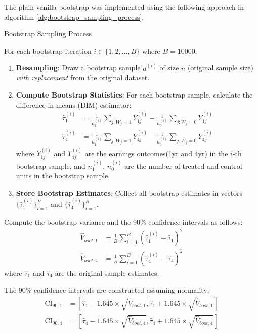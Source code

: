 \documentclass[11pt]{article}
\numberwithin{equation}{section}
\begin{document}
The plain vanilla bootstrap was implemented using the following approach in algorithm \ref{alg:bootstrap_sampling_process}.


\begin{algorithm}
    \caption{Bootstrap Sampling Process}
    \label{alg:bootstrap_sampling_process}
    For each bootstrap iteration $i \in \{1, 2, \ldots, B\}$ where $B = 10000$:
    \begin{enumerate}
    \item \textbf{Resampling}: Draw a bootstrap sample $d^{(i)}$ of size $n$ (original sample size) \textit{with replacement} from the original dataset. 
    
    \item \textbf{Compute Bootstrap Statistics}: For each bootstrap sample, calculate the difference-in-means (DIM) estimator:
    \begin{align}
        \hat{\tau}^{(i)}_1 &= \frac{1}{n^{(i)}_1} \sum_{j: W_j = 1} Y_{1j}^{(i)} - \frac{1}{n^{(i)}_0} \sum_{j: W_j = 0} Y_{1j}^{(i)} \\
        \hat{\tau}^{(i)}_4 &= \frac{1}{n^{(i)}_1} \sum_{j: W_j = 1} Y_{4j}^{(i)} - \frac{1}{n^{(i)}_0} \sum_{j: W_j = 0} Y_{4j}^{(i)}
    \end{align}
    where $Y_{1j}^{(i)}$ and $Y_{4j}^{(i)}$ are the earnings outcomes(1yr and 4yr) in the $i$-th bootstrap sample, and $n^{(i)}_1$, $n^{(i)}_0$ are the number of treated and control units in the bootstrap sample.
    
    \item \textbf{Store Bootstrap Estimates}: Collect all bootstrap estimates in vectors $\{\hat{\tau}^{(i)}_1\}_{i=1}^B$ and $\{\hat{\tau}^{(i)}_4\}_{i=1}^B$.
\end{enumerate}

Compute the bootstrap variance and the 90\% confidence intervals as follows:
\begin{align}
    \hat{V}_{boot,1} &= \frac{1}{B} \sum_{i=1}^B \left(\hat{\tau}^{(i)}_1 - \hat{\tau}_1\right)^2 \\
    \hat{V}_{boot,4} &= \frac{1}{B} \sum_{i=1}^B \left(\hat{\tau}^{(i)}_4 - \hat{\tau}_4\right)^2
\end{align}
where $\hat{\tau}_1$ and $\hat{\tau}_4$ are the original sample estimates.

The 90\% confidence intervals are constructed assuming normality:
\begin{align}
    \text{CI}_{90,1} &= \left[\hat{\tau}_1 - 1.645 \times \sqrt{\hat{V}_{boot,1}}, \hat{\tau}_1 + 1.645 \times \sqrt{\hat{V}_{boot,1}}\right] \\
    \text{CI}_{90,4} &= \left[\hat{\tau}_4 - 1.645 \times \sqrt{\hat{V}_{boot,4}}, \hat{\tau}_4 + 1.645 \times \sqrt{\hat{V}_{boot,4}}\right]
\end{align}
\end{algorithm}
\end{document}
